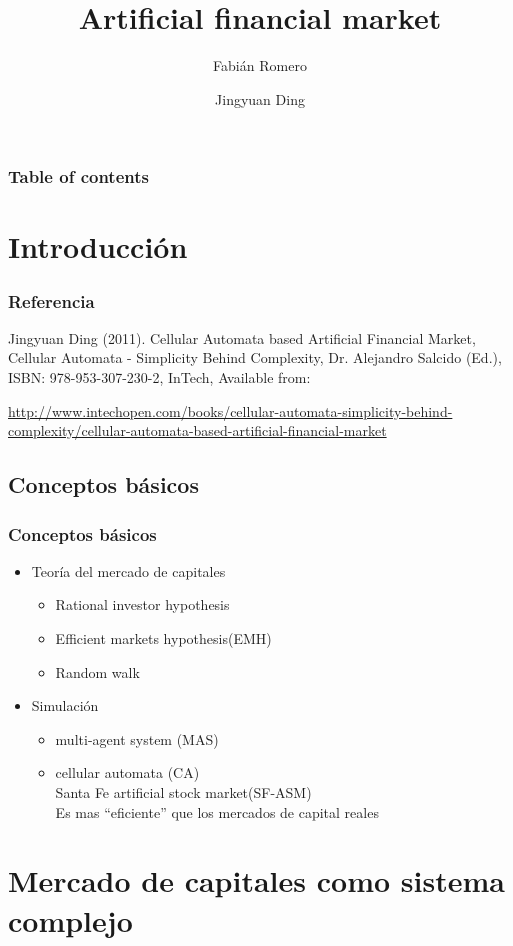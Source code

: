 \documentclass[hyperref={pdfpagelabels=false}]{beamer}
\title{Artificial financial market }
\author{Fabián Romero}
\date{Jingyuan Ding }
\begin{document}
\begin{frame}
\titlepage
\end{frame} 

\begin{frame}
\frametitle{Table of contents}
\tableofcontents
\end{frame}
 
\section{Introducción} 
\begin{frame}
\frametitle{Referencia} 
Jingyuan Ding (2011). Cellular Automata based Artificial Financial Market, Cellular Automata - Simplicity
Behind Complexity, Dr. Alejandro Salcido (Ed.), ISBN: 978-953-307-230-2, InTech, Available from:

\url{http://www.intechopen.com/books/cellular-automata-simplicity-behind-complexity/cellular-automata-based-artificial-financial-market}

\end{frame}

\subsection{Conceptos básicos}
\begin{frame}
\frametitle{Conceptos básicos} 

\begin{itemize}

\item Teoría del mercado de capitales
\begin{itemize}
\item Rational investor hypothesis
\item Efficient markets hypothesis(EMH)
\item Random walk
\end{itemize}
\item Simulación
\begin{itemize}
\item multi-agent system (MAS)
\item cellular automata (CA)\\
 Santa Fe artificial stock market(SF-ASM)\\
 Es mas ``eficiente'' que los mercados de capital reales
\end{itemize}
\end{itemize}
\end{frame}


\section{Mercado de capitales como sistema complejo} 
\end{document}
